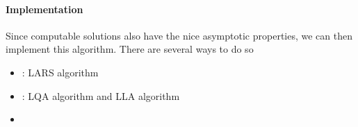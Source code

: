 \documentclass[twoside]{article}
\begin{document}
\paragraph*{Implementation} Since computable solutions also have the nice asymptotic properties, we can then implement this algorithm. There are several ways to do so 
\begin{itemize}
    \item {}: LARS algorithm \citep{efron2004least}
    \item {}: LQA algorithm \citep{fan2001variable} and LLA algorithm \citep{zou2008one}
    \item {} \citep{wu2008coordinate}
\end{itemize}
\end{document}
